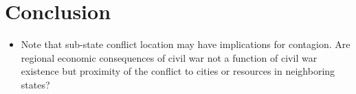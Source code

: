 \section{Conclusion}
\label{conclusion}

\begin{itemize}
	\item Note that sub-state conflict location may have implications for contagion.  Are regional economic consequences of civil war not a function of civil war existence but proximity of the conflict to cities or resources in neighboring states?
\end{itemize}